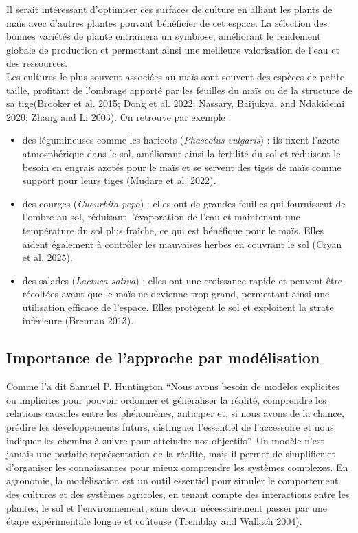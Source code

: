 \documentclass[
]{article}
\begin{document}
Il serait intéressant d'optimiser ces surfaces de culture en alliant les
plants de maïs avec d'autres plantes pouvant bénéficier de cet espace.
La sélection des bonnes variétés de plante entrainera un symbiose,
améliorant le rendement globale de production et permettant ainsi une
meilleure valorisation de l'eau et des ressources.\\
Les cultures le plus souvent associées au maïs sont souvent des espèces
de petite taille, profitant de l'ombrage apporté par les feuilles du
maïs ou de la structure de sa tige(Brooker et al. 2015; Dong et al.
2022; Nassary, Baijukya, and Ndakidemi 2020; Zhang and Li 2003). On
retrouve par exemple :

\begin{itemize}
\item
  des légumineuses comme les haricots (\emph{Phaseolus vulgaris}) : ils
  fixent l'azote atmosphérique dans le sol, améliorant ainsi la
  fertilité du sol et réduisant le besoin en engrais azotés pour le maïs
  et se servent des tiges de maïs comme support pour leurs tiges (Mudare
  et al. 2022).
\item
  des courges (\emph{Cucurbita pepo}) : elles ont de grandes feuilles
  qui fournissent de l'ombre au sol, réduisant l'évaporation de l'eau et
  maintenant une température du sol plus fraîche, ce qui est bénéfique
  pour le maïs. Elles aident également à contrôler les mauvaises herbes
  en couvrant le sol (Cryan et al. 2025).
\item
  des salades (\emph{Lactuca sativa}) : elles ont une croissance rapide
  et peuvent être récoltées avant que le maïs ne devienne trop grand,
  permettant ainsi une utilisation efficace de l'espace. Elles protègent
  le sol et exploitent la strate inférieure (Brennan 2013).
\end{itemize}

\subsection{Importance de l'approche par
modélisation}\label{importance-de-lapproche-par-moduxe9lisation}

Comme l'a dit Samuel P. Huntington ``Nous avons besoin de modèles
explicites ou implicites pour pouvoir ordonner et généraliser la
réalité, comprendre les relations causales entre les phénomènes,
anticiper et, si nous avons de la chance, prédire les développements
futurs, distinguer l'essentiel de l'accessoire et nous indiquer les
chemins à suivre pour atteindre nos objectifs''. Un modèle n'est jamais
une parfaite représentation de la réalité, mais il permet de simplifier
et d'organiser les connaissances pour mieux comprendre les systèmes
complexes. En agronomie, la modélisation est un outil essentiel pour
simuler le comportement des cultures et des systèmes agricoles, en
tenant compte des interactions entre les plantes, le sol et
l'environnement, sans devoir nécessairement passer par une étape
expérimentale longue et coûteuse (Tremblay and Wallach 2004).
\end{document}
